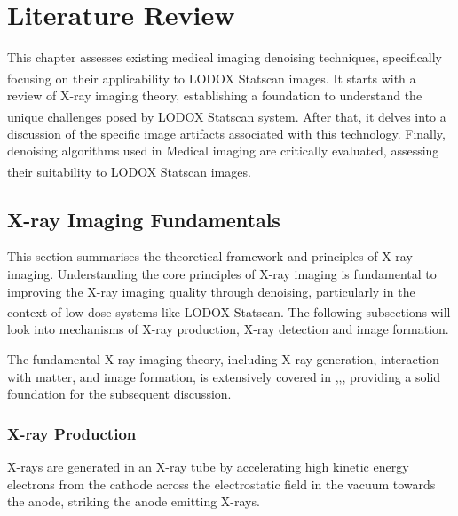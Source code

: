 
\glsresetall %
\chapter[Literature Review]{Literature Review}\label{ch:LitReview}

This chapter assesses existing medical imaging denoising techniques, specifically focusing on their applicability to LODOX\textsuperscript{\textregistered} Statscan\textsuperscript{\textregistered} images.  It starts with a review of X-ray imaging theory, establishing a foundation to understand the unique challenges posed by LODOX\textsuperscript{\textregistered} Statscan\textsuperscript{\textregistered} system.  After that, it delves into a discussion of the specific image artifacts associated with this technology.  Finally, denoising algorithms used in Medical imaging are critically evaluated, assessing their suitability to LODOX\textsuperscript{\textregistered} Statscan\textsuperscript{\textregistered} images.


\section{X-ray Imaging Fundamentals}
\label{ch:LitReview:X-ray Imaging Fundamentals}
This section summarises the theoretical framework and principles of X-ray imaging. Understanding the core principles of X-ray imaging is fundamental to improving the X-ray imaging quality through denoising, particularly in the context of low-dose systems like LODOX\textsuperscript{\textregistered} Statscan\textsuperscript{\textregistered}. The following subsections will look into mechanisms of X-ray production, X-ray detection and image formation.

The fundamental X-ray imaging theory, including X-ray generation, interaction with matter, and image formation, is extensively covered in \cite{haidekker_introduction_2013},\cite{haidekker_x-ray_2013},\cite{haidekker_trends_2013}, providing a solid foundation for the subsequent discussion.



\subsection{X-ray Production}
\label{ch:LitReview:X-ray Production}
X-rays are generated in an X-ray tube by accelerating high kinetic energy electrons from the cathode across the electrostatic field in the vacuum towards the anode, striking the anode emitting X-rays. 

